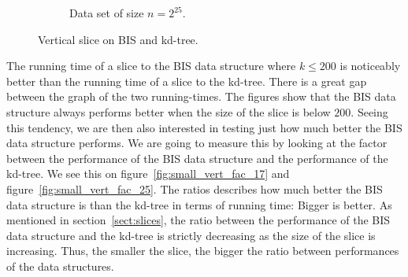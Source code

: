 \begin{figure}[h]
{\begin{subfigure}[b]{0.68\textwidth}
        \caption{Data set of size $n=2^{25}$.}
        \label{fig:small_vert_25}
    \end{subfigure}
  }
    \caption{Vertical slice on BIS and kd-tree.}
    \label{fig:small_vert_17_25}
  
\end{figure}

The running time of a slice to the BIS data structure where $k \leq 200$ is noticeably better than the running time of a slice to the kd-tree. There is a great gap between the graph of the two running-times. The figures show that the BIS data structure always performs better when the size of the slice is below $200$. Seeing this tendency, we are then also interested in testing just how much better the BIS data structure performs. We are going to measure this by looking at the factor between the performance of the BIS data structure and the performance of the kd-tree. We see this on figure~\ref{fig:small_vert_fac_17} and figure~\ref{fig:small_vert_fac_25}. The ratios describes how much better the BIS data structure is than the kd-tree in terms of running time: Bigger is better. As mentioned in section~\ref{sect:slices}, the ratio between the performance of the BIS data structure and the kd-tree is strictly decreasing as the size of the slice is increasing. Thus, the smaller the slice, the bigger the ratio between performances of the data structures. 



